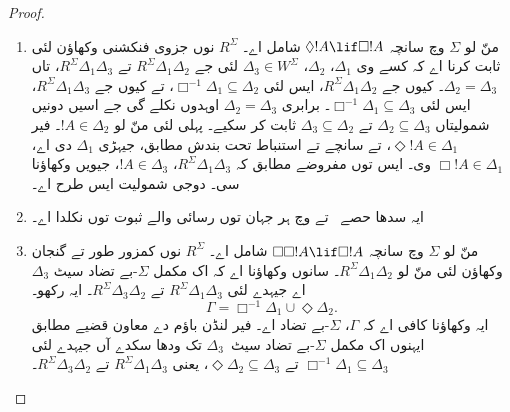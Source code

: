 \documentclass[../../../include/open-logic-section]{subfiles}
\begin{document}
\begin{proof}
  \begin{enumerate}
  \item منّ لو $\Sigma$ وچ سانچہ $\Diamond !A \lif
    \Box !A$ شامل اے۔ $R^\Sigma$ نوں جزوی فنکشنی وکھاؤن لئی ثابت کرنا اے کہ کسے وی $\Delta_1$، $\Delta_2$، $\Delta_3 \in
    W^\Sigma$ لئی جے $R^\Sigma \Delta_1\Delta_2$ تے $R^\Sigma
    \Delta_1\Delta_3$، تاں $\Delta_2=\Delta_3$۔ کیوں جے $R^\Sigma
    \Delta_1\Delta_2$، ایس لئی $\Box^{-1}\Delta_1 \subseteq \Delta_2$،
    تے کیوں جے $R^\Sigma \Delta_1\Delta_3$، ایس لئی $\Box^{-1}\Delta_1
    \subseteq \Delta_3$۔ برابری
    $\Delta_2=\Delta_3$ اوہدوں نکلے گی جے اسیں دونیں شمولیتاں
    $\Delta_2 \subseteq \Delta_3$ تے $\Delta_3 \subseteq
    \Delta_2$ ثابت کر سکیے۔ پہلی لئی منّ لو $!A \in \Delta_2$۔ فیر
    $\Diamond!A \in \Delta_1$، تے سانچے تے استنباط تحت بندش مطابق، جیہڑی $\Delta_1$ دی اے، $\Box!A \in \Delta_1$ وی۔ ایس توں مفروضے مطابق کہ
    $R^\Sigma \Delta_1\Delta_3$، $!A \in \Delta_3$، جیویں وکھاؤنا سی۔ دوجی شمولیت ایس طرح اے۔

  \item ایہ سدھا حصے~ تے
     وچ ہر جہان توں رسائی والے ثبوت توں نکلدا اے۔

  \item منّ لو $\Sigma$ وچ سانچہ $\Box\Box!A \lif \Box!A$ شامل اے۔ $R^\Sigma$ نوں کمزور طور تے گنجان وکھاؤن لئی منّ لو $R^\Sigma
    \Delta_1\Delta_2$۔ سانوں وکھاؤنا اے کہ اک مکمل $\Sigma$-بے تضاد سیٹ $\Delta_3$ اے جیہدے لئی $R^\Sigma
    \Delta_1\Delta_3$ تے $R^\Sigma \Delta_3\Delta_2$۔ ایہ رکھو۔
    \[
    \Gamma = \Box^{-1}\Delta_1 \cup \Diamond\Delta_2.
    \]
    ایہ وکھاؤنا کافی اے کہ $\Gamma$، $\Sigma$-بے تضاد اے۔ فیر لنڈن باؤم دے معاون قضیے مطابق ایہنوں اک مکمل
    $\Sigma$-بے تضاد سیٹ~$\Delta_3$ تک ودھا سکدے آں جیہدے لئی $\Box^{-1}\Delta_1
    \subseteq \Delta_3$ تے $\Diamond\Delta_2 \subseteq \Delta_3$،
    یعنی $R^\Sigma \Delta_1\Delta_3$ تے $R^\Sigma
    \Delta_3\Delta_2$۔


\end{enumerate}
\end{proof}
\end{document}
